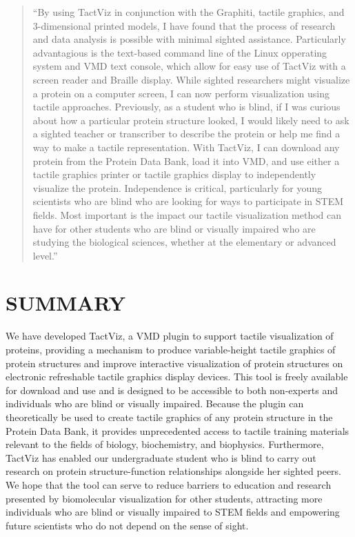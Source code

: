 \documentclass[11.5pt]{sig-alternate} %
\begin{document}
\begin{large}
\begin{quote}
    “By using TactViz in conjunction with the Graphiti, tactile graphics, and 3-dimensional printed models, I have found that the process of research and data analysis is possible with minimal sighted assistance. Particularly advantagious is the text-based command line of the Linux opperating system and VMD text console, which allow for easy use of TactViz with a screen reader and Braille display. While sighted researchers might visualize a protein on a computer screen, I can now perform visualization using tactile approaches. Previously, as a student who is blind, if I was curious about how a particular protein structure looked, I would likely need to ask a sighted teacher or transcriber to describe the protein or help me find a way to make a tactile representation. With TactViz, I can download any protein from the Protein Data Bank, load it into VMD, and use either a tactile graphics printer or tactile graphics display to independently visualize the protein. Independence is critical, particularly for young scientists who are blind who are looking for ways to participate in STEM fields. Most important is the impact our tactile visualization method can have for other students who are blind or visually impaired who are studying the biological sciences, whether at the elementary or advanced level.”
\end{quote}

\section*{SUMMARY}

We have developed TactViz, a VMD plugin to support tactile visualization of proteins, providing a mechanism to produce variable-height tactile graphics of protein structures and improve interactive visualization of protein structures on electronic refreshable tactile graphics display devices. This tool is freely available for download and use and is designed to be accessible to both non-experts and individuals who are blind or visually impaired. Because the plugin can theoretically be used to create tactile graphics of any protein structure in the Protein Data Bank, it provides unprecedented access to tactile training materials relevant to the fields of biology, biochemistry, and biophysics. Furthermore, TactViz has enabled our undergraduate student who is blind to carry out research on protein structure-function relationships alongside her sighted peers. We hope that the tool can serve to reduce barriers to education and research presented by biomolecular visualization for other students, attracting more individuals who are blind or visually impaired to STEM fields and empowering future scientists who do not depend on the sense of sight.


\end{large}
\end{document}
